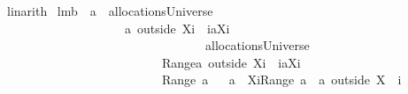 \begin{isabellebody}
\ linarith\isanewline
{}\isamarkupfalse%
%
\endisatagproof
{\isafoldproof}%
%
\isadelimproof
\isanewline
%
\endisadelimproof
\isanewline
{}\isamarkupfalse%
\ lm{}{}b{\isacharcolon}\ \ {\isachardoublequoteopen}a\ {\isasymin}\ allocationsUniverse{\isachardoublequoteclose}\ \isanewline
\ \ \ \ \ \ \ \ \ \ \ \ \ \ \ \ \ \ \ \ {\isachardoublequoteopen}{\isacharparenleft}a\ outside\ {\isacharparenleft}X{\isasymunion}{\isacharbraceleft}i{\isacharbraceright}{\isacharparenright}{\isacharparenright}\ {\isasymunion}\ {\isacharparenleft}{\isacharbraceleft}i{\isacharbraceright}{\isasymtimes}{\isacharparenleft}{\isacharbraceleft}{\isasymUnion}{\isacharparenleft}a{\isacharbackquote}{\isacharbackquote}{\isacharparenleft}X{\isasymunion}{\isacharbraceleft}i{\isacharbraceright}{\isacharparenright}{\isacharparenright}{\isacharbraceright}{\isacharminus}{\isacharbraceleft}{\isacharbraceleft}{\isacharbraceright}{\isacharbraceright}{\isacharparenright}{\isacharparenright}\ \isanewline
\ \ \ \ \ \ \ \ \ \ \ \ \ \ \ \ \ \ \ \ \ \ \ \ \ \ \ \ \ \ \ \ {\isasymin}\ allocationsUniverse\ {\isacharampersand}\ \isanewline
\ \ \ \ \ \ \ \ \ \ \ \ \ \ \ \ \ \ \ \ \ \ \ \ \ \ {\isasymUnion}{\isacharparenleft}Range{\isacharparenleft}{\isacharparenleft}a\ outside\ {\isacharparenleft}X{\isasymunion}{\isacharbraceleft}i{\isacharbraceright}{\isacharparenright}{\isacharparenright}\ {\isasymunion}\ {\isacharparenleft}{\isacharbraceleft}i{\isacharbraceright}{\isasymtimes}{\isacharparenleft}{\isacharbraceleft}{\isasymUnion}{\isacharparenleft}a{\isacharbackquote}{\isacharbackquote}{\isacharparenleft}X{\isasymunion}{\isacharbraceleft}i{\isacharbraceright}{\isacharparenright}{\isacharparenright}{\isacharbraceright}{\isacharminus}{\isacharbraceleft}{\isacharbraceleft}{\isacharbraceright}{\isacharbraceright}{\isacharparenright}{\isacharparenright}{\isacharparenright}{\isacharparenright}\ {\isacharequal}\ \isanewline
\ \ \ \ \ \ \ \ \ \ \ \ \ \ \ \ \ \ \ \ \ \ \ \ \ \ {\isasymUnion}{\isacharparenleft}Range\ a{\isacharparenright}{\isachardoublequoteclose}\isanewline
%
\isadelimproof
%
\endisadelimproof
%
\isatagproof
{}\isamarkupfalse%
\ {\isacharminus}\isanewline
{}\isamarkupfalse%
\ {\isachardoublequoteopen}a\ {\isacharminus}\ {\isacharparenleft}{\isacharparenleft}X{\isasymunion}{\isacharbraceleft}i{\isacharbraceright}{\isacharparenright}{\isasymtimes}{\isacharparenleft}Range\ a{\isacharparenright}{\isacharparenright}\ {\isacharequal}\ a\ outside\ {\isacharparenleft}X\ {\isasymunion}\ {\isacharbraceleft}i{\isacharbraceright}{\isacharparenright}{\isachardoublequoteclose}\ \isamarkupfalse%

\end{isabellebody}
